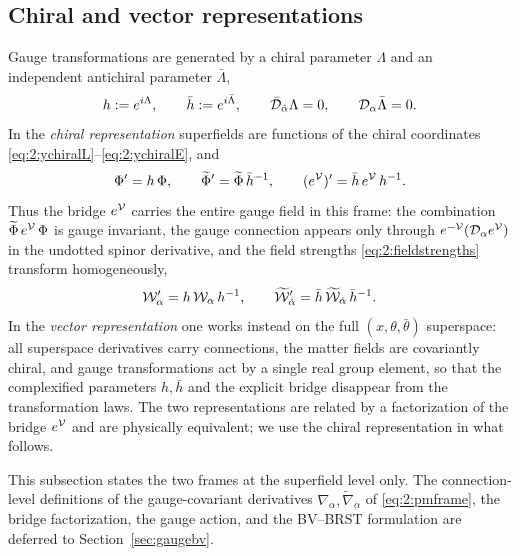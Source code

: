 \subsection{Chiral and vector representations}\label{sec:notation:representations}

Gauge transformations are generated by a chiral parameter $\Lambda$ and an
independent antichiral parameter $\bar\Lambda$,
\begin{equation}
h:=e^{i\Lambda},\qquad \bar h:=e^{i\bar\Lambda},\qquad
\bar{\mathcal{D}}_{\dot\alpha}\Lambda=0,\qquad \mathcal{D}_\alpha\bar\Lambda=0 .
\label{eq:2:gaugeparams}
\end{equation}
In the \emph{chiral representation} superfields are functions of the chiral
coordinates \eqref{eq:2:ychiralL}--\eqref{eq:2:ychiralE}, and
\begin{equation}
\Phi'=h\,\Phi,\qquad
\widetilde\Phi'=\widetilde\Phi\,\bar h^{-1},\qquad
(e^{\mathcal{V}})'=\bar h\,e^{\mathcal{V}}\,h^{-1} .
\label{eq:2:chiralframe}
\end{equation}
Thus the bridge $e^{\mathcal{V}}$ carries the entire gauge field in this frame: the
combination $\widetilde\Phi\,e^{\mathcal{V}}\,\Phi$ is gauge invariant, the gauge
connection appears only through $e^{-\mathcal{V}}(\mathcal{D}_\alpha e^{\mathcal{V}})$ in the undotted
spinor derivative, and the field strengths \eqref{eq:2:fieldstrengths}
transform homogeneously,
\begin{equation}
\mathcal{W}'_\alpha=h\,\mathcal{W}_\alpha\,h^{-1},\qquad
\widetilde{\mathcal{W}}'_{\dot\alpha}=\bar h\,\widetilde{\mathcal{W}}_{\dot\alpha}\,\bar h^{-1} .
\label{eq:2:Wtransform}
\end{equation}
In the \emph{vector representation} one works instead on the full
$(x,\theta,\bar\theta)$ superspace: all superspace derivatives carry
connections, the matter fields are covariantly chiral, and gauge
transformations act by a single real group element, so that the complexified
parameters $h,\bar h$ and the explicit bridge disappear from the
transformation laws. The two representations are related by a factorization of
the bridge $e^{\mathcal{V}}$ and are physically equivalent; we use the chiral
representation in what follows.
\begin{remark}\label{rem:2:frames}
This subsection states the two frames at the superfield level only. The
connection-level definitions of the gauge-covariant derivatives
$\nabla_\alpha,\widetilde\nabla_{\dot\alpha}$ of \eqref{eq:2:pmframe}, the
bridge factorization, the gauge action, and the BV--BRST formulation are
deferred to Section~\ref{sec:gaugebv}.
\end{remark}

